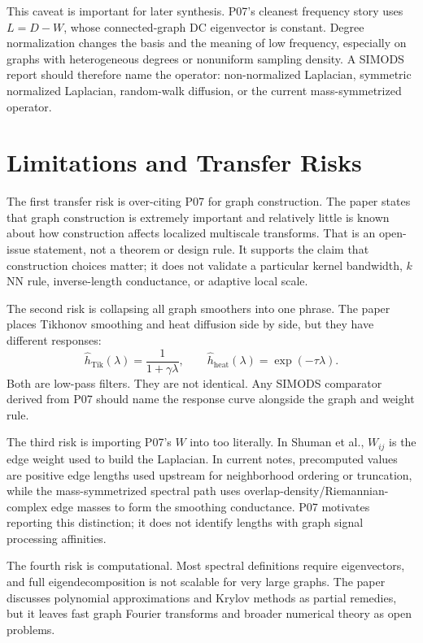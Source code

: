 \documentclass[11pt]{article}
\begin{document}
This caveat is important for later synthesis.  P07's cleanest frequency
story uses $L=D-W$, whose connected-graph DC eigenvector is constant.  Degree
normalization changes the basis and the meaning of low frequency, especially
on graphs with heterogeneous degrees or nonuniform sampling density.  A
SIMODS report should therefore name the operator: non-normalized Laplacian,
symmetric normalized Laplacian, random-walk diffusion, or the current
mass-symmetrized  operator.

\section{Limitations and Transfer Risks}

The first transfer risk is over-citing P07 for graph construction.  The paper
states that graph construction is extremely important and relatively little
is known about how construction affects localized multiscale transforms.  That
is an open-issue statement, not a theorem or design rule.  It supports the
claim that construction choices matter; it does not validate a particular
kernel bandwidth, $k$NN rule, inverse-length conductance, or adaptive local
scale.

The second risk is collapsing all graph smoothers into one phrase.  The paper
places Tikhonov smoothing and heat diffusion side by side, but they have
different responses:
\[
  \hat h_{\mathrm{Tik}}(\lambda)=\frac{1}{1+\gamma\lambda},
  \qquad
  \hat h_{\mathrm{heat}}(\lambda)=\exp(-\tau\lambda).
\]
Both are low-pass filters.  They are not identical.  Any SIMODS comparator
derived from P07 should name the response curve alongside the graph and
weight rule.

The third risk is importing P07's $W$ into  too literally.  In
Shuman et al., $W_{ij}$ is the edge weight used to build the Laplacian.  In
current  notes, precomputed  values are positive
edge lengths used upstream for neighborhood ordering or truncation, while the
mass-symmetrized spectral path uses overlap-density/Riemannian-complex edge
masses to form the smoothing conductance.  P07 motivates reporting this
distinction; it does not identify  lengths with graph
signal processing affinities.

The fourth risk is computational.  Most spectral definitions require
eigenvectors, and full eigendecomposition is not scalable for very large
graphs.  The paper discusses polynomial approximations and Krylov methods as
partial remedies, but it leaves fast graph Fourier transforms and broader
numerical theory as open problems.
\end{document}

